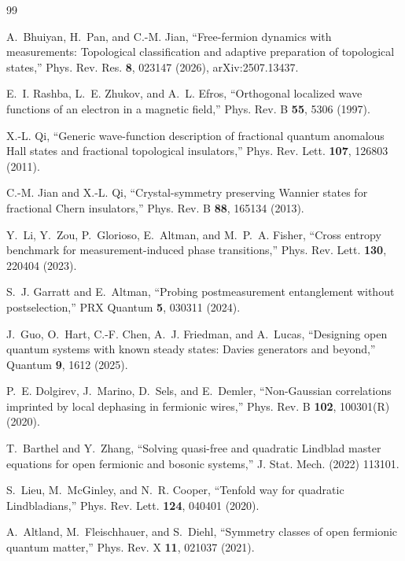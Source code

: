 \documentclass[aps,prl,onecolumn,superscriptaddress,nofootinbib]{revtex4-2}
\begin{document}
\begin{thebibliography}{99}

A.~Bhuiyan, H.~Pan, and C.-M. Jian,
``Free-fermion dynamics with measurements: Topological classification and adaptive preparation of topological states,''
Phys. Rev. Res. \textbf{8}, 023147 (2026), arXiv:2507.13437.

E.~I. Rashba, L.~E. Zhukov, and A.~L. Efros,
``Orthogonal localized wave functions of an electron in a magnetic field,''
Phys. Rev. B \textbf{55}, 5306 (1997).

X.-L. Qi,
``Generic wave-function description of fractional quantum anomalous Hall states and fractional topological insulators,''
Phys. Rev. Lett. \textbf{107}, 126803 (2011).

C.-M. Jian and X.-L. Qi,
``Crystal-symmetry preserving Wannier states for fractional Chern insulators,''
Phys. Rev. B \textbf{88}, 165134 (2013).

Y.~Li, Y.~Zou, P.~Glorioso, E.~Altman, and M.~P.~A. Fisher,
``Cross entropy benchmark for measurement-induced phase transitions,''
Phys. Rev. Lett. \textbf{130}, 220404 (2023).

S.~J. Garratt and E.~Altman,
``Probing postmeasurement entanglement without postselection,''
PRX Quantum \textbf{5}, 030311 (2024).

J.~Guo, O.~Hart, C.-F. Chen, A.~J. Friedman, and A.~Lucas,
``Designing open quantum systems with known steady states: Davies generators and beyond,''
Quantum \textbf{9}, 1612 (2025).

P.~E. Dolgirev, J.~Marino, D.~Sels, and E.~Demler,
``Non-Gaussian correlations imprinted by local dephasing in fermionic wires,''
Phys. Rev. B \textbf{102}, 100301(R) (2020).

T.~Barthel and Y.~Zhang,
``Solving quasi-free and quadratic Lindblad master equations for open fermionic and bosonic systems,''
J. Stat. Mech. (2022) 113101.

S.~Lieu, M.~McGinley, and N.~R. Cooper,
``Tenfold way for quadratic Lindbladians,''
Phys. Rev. Lett. \textbf{124}, 040401 (2020).

A.~Altland, M.~Fleischhauer, and S.~Diehl,
``Symmetry classes of open fermionic quantum matter,''
Phys. Rev. X \textbf{11}, 021037 (2021).


\end{thebibliography}
\end{document}
